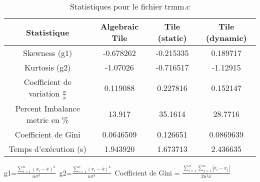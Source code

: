 \documentclass{article}
\begin{document}
\begin{table}[htbp]
  \centering
  \caption{Statistiques pour le fichier trmm.c}
  \begin{tabular}{|c|c|c|c|}
    \hline
    Statistique & Algebraic Tile & Tile (static) & Tile (dynamic) \\ 
    \hline
    Skewness (g1)  & -0.678262 & -0.215335 & 0.189717 \\ 
    Kurtosis (g2)  & -1.07026 & -0.716517 & -1.12915 \\ 
    Coefficient de variation $ \frac{\sigma}{\overline{x}} $ & 0.119088 & 0.227816 & 0.152147\\ 
    Percent Imbalance metric en \% & 13.917 & 35.1614 & 28.7716\\ 
    Coefficient de Gini  & 0.0646509 & 0.126651 & 0.0869639\\ 
    Temps d'exécution (s) &  1.943920    &  1.673713   &  2.436635   \\ 

    \hline
  \end{tabular}
\end{table}
g1=$ \frac{\sum_{i=1}^{n} (x_i - \overline{x})^3}{n\sigma^3} $\
g2=$ \frac{\sum_{i=1}^{n} (x_i - \overline{x})^4}{n\sigma^4} $\
Coefficient de Gini = $ \frac{\sum_{i=1}^{n}\sum_{j=1}^{n} |x_i - x_j|}{2n^2\overline{x}} $\
\newpage
\end{document}

